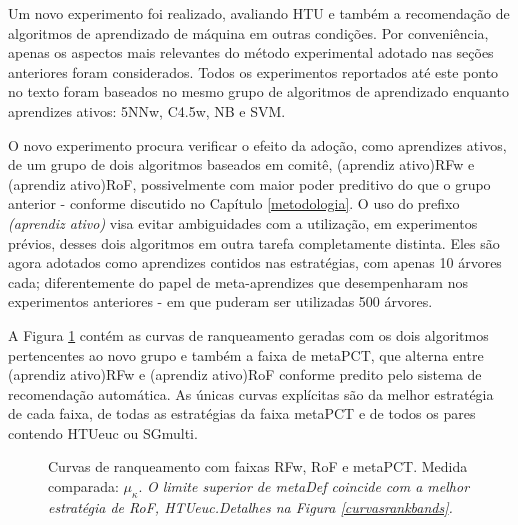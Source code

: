 Um novo experimento foi realizado, avaliando HTU e também a recomendação de algoritmos de aprendizado de máquina em outras condições.
Por conveniência, apenas os aspectos mais relevantes do método experimental adotado nas seções anteriores foram considerados.
Todos os experimentos reportados até este ponto no texto foram baseados no mesmo grupo de algoritmos de aprendizado enquanto aprendizes ativos: 5NNw, C4.5w, NB e SVM.

O novo experimento procura verificar o efeito da adoção, como aprendizes ativos, de um grupo de dois algoritmos baseados em comitê, (aprendiz ativo)RFw e (aprendiz ativo)RoF, possivelmente com maior poder preditivo do que o grupo anterior - conforme discutido no Capítulo \ref{metodologia}.
O uso do prefixo \textit{(aprendiz ativo)} visa evitar ambiguidades com a utilização, em experimentos prévios, desses dois algoritmos em outra tarefa completamente distinta.
Eles são agora adotados como aprendizes contidos nas estratégias, com apenas 10 árvores cada; diferentemente do papel de meta-aprendizes que desempenharam nos experimentos anteriores - em que puderam ser utilizadas 500 árvores.

A Figura \ref{plotfim} contém as curvas de ranqueamento geradas com os dois algoritmos pertencentes ao novo grupo e também a faixa de metaPCT, que alterna entre (aprendiz ativo)RFw e (aprendiz ativo)RoF conforme predito pelo sistema de recomendação automática.
As únicas curvas explícitas são da melhor estratégia de cada faixa, de todas as estratégias da faixa metaPCT e de todos os pares contendo HTUeuc ou SGmulti.
\begin{figure}[]
\centering
	
	\caption[Curvas de ranqueamento com faixas RFw, RoF e metaPCT.]{Curvas de ranqueamento com faixas RFw, RoF e metaPCT. Medida comparada: $\mu_{\kappa}$.
	\textit{O limite superior de metaDef coincide com a melhor estratégia de RoF, HTUeuc.}\textit{Detalhes na Figura \ref{curvasrankbands}.}}
	\label{plotfim}
\end{figure}


